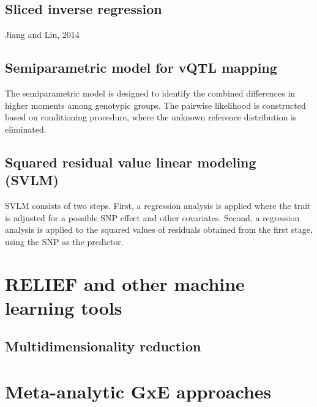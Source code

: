 \documentclass[
]{book}
\begin{document}
\hypertarget{sliced-inverse-regression}{%
\subsection{Sliced inverse regression}\label{sliced-inverse-regression}}

Jiang and Liu, 2014

\hypertarget{semiparametric-model-for-vqtl-mapping}{%
\subsection{Semiparametric model for vQTL mapping}\label{semiparametric-model-for-vqtl-mapping}}

The semiparametric model is designed to identify the combined differences in higher moments among genotypic groups. The pairwise likelihood is constructed based on conditioning procedure, where the unknown reference distribution is eliminated.

\hypertarget{squared-residual-value-linear-modeling-svlm}{%
\subsection{Squared residual value linear modeling (SVLM)}\label{squared-residual-value-linear-modeling-svlm}}

SVLM consists of two steps. First, a regression analysis is applied where the trait is adjusted for a possible SNP effect and other covariates. Second, a regression analysis is applied to the squared values of residuals obtained from the first stage, using the SNP as the predictor.

\hypertarget{relief-and-other-machine-learning-tools}{%
\section{RELIEF and other machine learning tools}\label{relief-and-other-machine-learning-tools}}

\hypertarget{multidimensionality-reduction}{%
\subsection{Multidimensionality reduction}\label{multidimensionality-reduction}}

\hypertarget{meta-analytic-gxe-approaches}{%
\section{Meta-analytic GxE approaches}\label{meta-analytic-gxe-approaches}}
\end{document}
